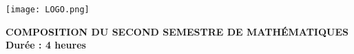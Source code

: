 \documentclass[a4paper,12pt]{book}
\begin{document}
	\newcommand{\R}{\mathbb{R}}
	\newcommand{\F}{\mathcal{F}}
	\newcommand{\PO}{\mathbb{P}}
	\newcommand{\E}{\mathbb{E}}
	\newcommand{\SQ}{\mathcal{S}}
	\newcommand{\N}{\mathcal{N}}
	\newcommand{\dia}{\diamondsuit}
	\newcommand{\B}{\mathcal{B}}
	\newcommand{\M}{\mathcal{M}}
	\newcommand{\G}{\mathcal{G}}
	\newcommand{\LK}{\mathcal{L}}
	\newcommand{\C}{\mathcal{C}}
	\newtheorem{theo}{Th\'{e}or\`{e}me}[chapter]
	\newtheorem{lem}{Lemme}[chapter]
	\newtheorem{coro}{Corollaire}[chapter]
	\newtheorem{propo}{Proposition}[chapter]
	\newtheorem{defi}{D\'{e}finition}[chapter]
	\newtheorem{rem}{Remarque}[chapter]
	\newtheorem{exa}{Exemple}[chapter]
	\newtheorem{proof}{Preuve}[chapter]
	\newtheorem{exo}{Exercice}[chapter]
	\pagestyle{fancy}
	\lfoot{ }
	\cfoot{}
	\rfoot{\thepage}
	\renewcommand{\headrulewidth}{0.5pt}
	\renewcommand{\footrulewidth}{0.5pt}
	\vspace*{0.5cm}
	\begin{minipage}{2cm}
		\texttt{[image: LOGO.png]} 
	\end{minipage}
	\begin{minipage}{13cm}
		\begin{center}
			\textbf{COMPOSITION DU SECOND SEMESTRE DE MATHÉMATIQUES}\\
			\textbf{Durée : 4 heures}	
		\end{center}
	\end{minipage}
	
\end{document}
